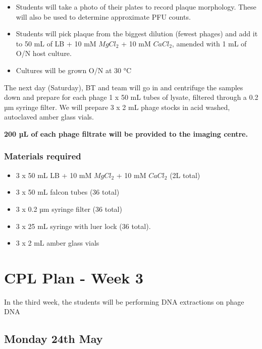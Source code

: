 \documentclass[
]{book}
\providecommand{\tightlist}{%
  \setlength{\itemsep}{0pt}\setlength{\parskip}{0pt}}
\begin{document}
\begin{itemize}
\tightlist
\item
  Students will take a photo of their plates to record plaque morphology. These will also be used to determine approximate PFU counts.
\item
  Students will pick plaque from the biggest dilution (fewest phages) and add it to 50 mL of LB + 10 mM \(MgCl_{2}\) + 10 mM \(CaCl_{2}\), amended with 1 mL of O/N host culture.
\item
  Cultures will be grown O/N at 30 °C
\end{itemize}

The next day (Saturday), BT and team will go in and centrifuge the samples down and prepare for each phage 1 x 50 mL tubes of lysate, filtered through a 0.2 µm syringe filter. We will prepare 3 x 2 mL phage stocks in acid washed, autoclaved amber glass vials.

\textbf{200 µL of each phage filtrate will be provided to the imaging centre.}

\hypertarget{materials-required-4}{%
\subsection{Materials required}\label{materials-required-4}}

\begin{itemize}
\tightlist
\item
  3 x 50 mL LB + 10 mM \(MgCl_{2}\) + 10 mM \(CaCl_{2}\) (2L total)
\item
  3 x 50 mL falcon tubes (36 total)
\item
  3 x 0.2 µm syringe filter (36 total)
\item
  3 x 25 mL syringe with luer lock (36 total).
\item
  3 x 2 mL amber glass vials
\end{itemize}

\hypertarget{cpl-plan---week-3}{%
\chapter{CPL Plan - Week 3}\label{cpl-plan---week-3}}

In the third week, the students will be performing DNA extractions on phage DNA

\hypertarget{monday-24th-may}{%
\section{Monday 24th May}\label{monday-24th-may}}
\end{document}
